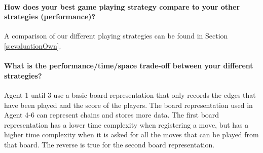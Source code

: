 \paragraph{How does your best game playing strategy compare to your other strategies (performance)?} A comparison of our different playing strategies can be found in Section \ref{s:evaluationOwn}.
	
\paragraph{What is the performance/time/space trade-off between your different strategies?} Agent 1 until 3 use a basic board representation that only records the edges that have been played and the score of the players. The board representation used in Agent 4-6 can represent chains and stores more data. The first board representation has a lower time complexity when registering a move, but has a higher time complexity when it is asked for all the moves that can be played from that board. The reverse is true for the second board representation.
